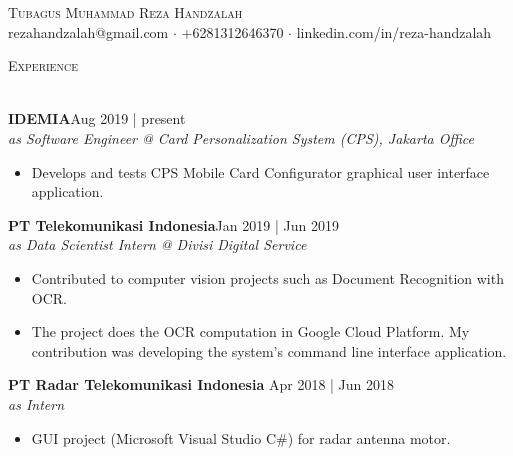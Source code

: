 \documentclass[a4paper]{article}
\newcommand{\lineunder} {
    \vspace*{-8pt} \\
    \hspace*{-18pt} \hrulefill \\
}
\newcommand{\header} [1] {
    {\hspace*{-18pt}\vspace*{6pt} \textsc{#1}}
    \vspace*{-6pt} \lineunder
}
\begin{document}
\vspace*{-40pt}

    

\vspace*{-10pt}
\begin{center}
	{\Large \scshape {Tubagus Muhammad Reza Handzalah}}\\
	rezahandzalah@gmail.com $\cdot$ +6281312646370 $\cdot$ linkedin.com/in/reza-handzalah\\
\end{center}

\header{Experience}
\vspace{1mm}

\textbf{IDEMIA}\hfill Aug 2019 | present\\
\textit{as Software Engineer @ Card Personalization System (CPS), Jakarta Office}\\
\vspace{-1mm}
\begin{itemize} \itemsep 1pt
	\item Develops and tests CPS Mobile Card Configurator graphical user interface application.
\end{itemize}
\vspace{1mm}

\textbf{PT Telekomunikasi Indonesia}\hfill Jan 2019 | Jun 2019\\
\textit{as Data Scientist Intern @ Divisi Digital Service}\\
\vspace{-1mm}
\begin{itemize} \itemsep 1pt
	\item Contributed to computer vision projects such as Document Recognition with OCR.
	\item The project does the OCR computation in Google Cloud Platform. My contribution was developing the system's command line interface application.
\end{itemize}
\vspace{1mm}



\textbf{PT Radar Telekomunikasi Indonesia} \hfill Apr 2018 | Jun 2018\\
\textit{as Intern}\\
\vspace{-1mm}
\begin{itemize} \itemsep 1pt
	\item GUI project (Microsoft Visual Studio C\#) for radar antenna motor.
  
\end{itemize}
\end{document}
